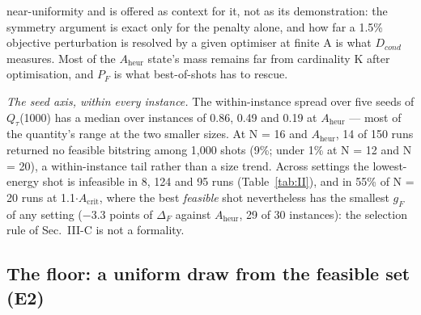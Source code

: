\documentclass{ieeeaccess}
\begin{document}
near-uniformity and is offered as context for it, not as its demonstration: the symmetry argument is exact only for the penalty alone, and how far a 1.5\% objective perturbation is resolved by a given optimiser at finite A is what $D_{cond}$ measures. Most of the $A_{\mathrm{heur}}$ state's mass remains far from cardinality K after optimisation, and $P_{F}$ is what best-of-shots has to rescue.


\textit{The seed axis, within every instance.} The within-instance spread over five seeds of $Q_{\tau}$(1000) has a median over instances of 0.86, 0.49 and 0.19 at $A_{\mathrm{heur}}$ --- most of the quantity's range at the two smaller sizes. At N = 16 and $A_{\mathrm{heur}}$, 14 of 150 runs returned no feasible bitstring among 1,000 shots (9\%; under 1\% at N = 12 and N = 20), a within-instance tail rather than a size trend. Across settings the lowest-energy shot is infeasible in 8, 124 and 95 runs (Table~\ref{tab:II}), and in 55\% of N = 20 runs at 1.1$\cdot$$A_{\mathrm{crit}}$, where the best \textit{feasible} shot nevertheless has the smallest $g_{F}$ of any setting ($-$3.3 points of $\Delta_{F}$ against $A_{\mathrm{heur}}$, 29 of 30 instances): the selection rule of Sec.~III-C is not a formality.


\subsection{The floor: a uniform draw from the feasible set (E2)}
\end{document}
